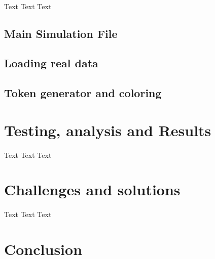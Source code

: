 \documentclass[a4paper]{article}
\begin{document}
\paragraph{}
Text Text Text

\subsection{Main Simulation File}
\subsection{Loading real data}
\subsection{Token generator and coloring}

%                                      
\section{Testing, analysis and Results}   

\paragraph{}
Text Text Text

%
\section{Challenges and solutions}    

\paragraph{}
Text Text Text

%
\section{Conclusion}

\end{document}
